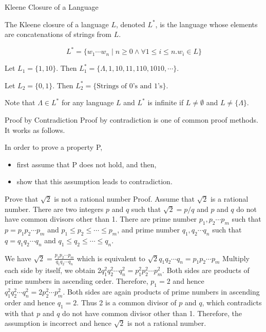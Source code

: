 \documentclass[notes=none]{beamer}
\begin{document}
\begin{frame}{Kleene Closure of a Language}

The Kleene closure of a language $L$, denoted $L^*$, is the language whose elements are concatenations of strings from $L$.

\[ L^* = \{w_1\cdots w_n \mid n\geq 0 \wedge \forall 1\leq i\leq n. w_i\in L\}
\]


Let $L_1=\{1,10\}$. Then $L_1^{*} = \{\Lambda, 1, 10, 11, 110,1010, \cdots \}$.

Let $L_2=\{0,1\}$. Then $L_2^*=\{\mbox{Strings of 0's and 1's}\}$.

Note that $\Lambda \in L^*$ for any language $L$ and $L^*$ is infinite if $L\neq \emptyset$ and $L\neq \{\Lambda\}$.

\end{frame}

\begin{frame}{Proof by Contradiction} 
Proof by contradiction is one of common proof methods. It works as follows.
 
In order to prove a property P, 
\begin{itemize} 
\item first assume that P does not hold, and then, 
\item show that this assumption leads to contradiction.
\end{itemize}
\end{frame}

\begin{frame}{Prove that $\sqrt{2}$ is not a rational number}
Proof. Assume that $\sqrt{2}$ is a rational number. There are two integers 
 	   $p$ and $q$ such that $\sqrt{2}=p/q$ and $p$ and $q$ do not have 
 	   common divisors other than 1. There are prime number $p_1,p_2\cdots p_m$ such that $p=p_1p_2\cdots p_m$ and 
 	   $p_1\leq p_2\leq\cdots\leq p_m$,  and    prime number $q_1,q_2\cdots q_n$ such that $q=q_1q_2\cdots q_n$ and 
 	   $q_1\leq q_2\leq\cdots\leq q_n$. 
 	   
 	   We have $\sqrt{2} = \frac{p_1p_2\cdots p_m}{q_1q_2\cdots q_n}$ which is equivalent to 
 	   $\sqrt{2}{q_1q_2\cdots q_n} = {p_1p_2\cdots p_m}$ 
 	   Multiply each side by itself, we obtain 
 	   $2{q_1^2q_2^2\cdots q_n^2}={p_1^2p_2^2\cdots p_m^2}$. Both sides are products of prime numbers in ascending order. 
 	   Therefore, $p_1=2$ and hence 
 	   ${q_1^2q_2^2\cdots q_n^2}=2p_2^2\cdots p_m^2$. Both sides are again products of prime numbers in ascending order 
 	   and hence $q_1=2$. Thus 2 is a common divisor of $p$ and $q$, which contradicts with that $p$ and $q$ do not have 
 	   common divisor other than 1. Therefore, the assumption is incorrect and hence $\sqrt{2}$ is not a rational number.
\end{frame}
\end{document}
